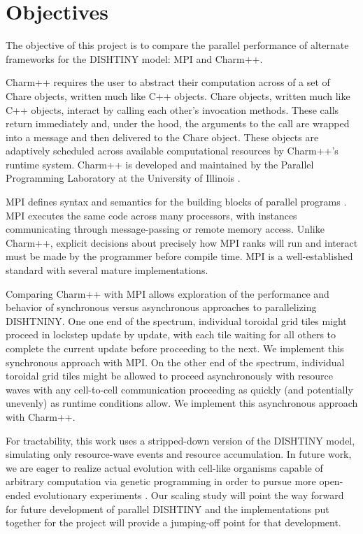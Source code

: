 \section{Objectives}

The objective of this project is to compare the parallel performance of alternate frameworks for the DISHTINY model: MPI and Charm++.

Charm++ requires the user to abstract their computation across of a set of Chare objects, written much like C++ objects.
Chare objects, written much like C++ objects, interact by calling each other's invocation methods.
These calls return immediately and, under the hood, the arguments to the call are wrapped into a message and then delivered to the Chare object.
These objects are adaptively scheduled across available computational resources by Charm++'s runtime system.
Charm++ is developed and maintained by the Parallel Programming Laboratory at the University of Illinois \cite{kale1993charm++}.

MPI defines syntax and semantics for the building blocks of parallel programs \cite{Forum:1994:MMI:898758}.
MPI executes the same code across many processors, with instances communicating through message-passing or remote memory access.
Unlike Charm++, explicit decisions about precisely how MPI ranks will run and interact must be made by the programmer before compile time.
MPI is a well-established standard with several mature implementations.

Comparing Charm++ with MPI allows exploration of the performance and behavior of synchronous versus asynchronous approaches to parallelizing DISHTNINY.
One one end of the spectrum, individual toroidal grid tiles might proceed in lockstep update by update, with each tile waiting for all others to complete the current update before proceeding to the next.
We implement this synchronous approach with MPI.
On the other end of the spectrum, individual toroidal grid tiles might be allowed to proceed asynchronously with resource waves with any cell-to-cell communication proceeding as quickly (and potentially unevenly) as runtime conditions allow.
We implement this asynchronous approach with Charm++.

For tractability, this work uses a stripped-down version of the DISHTINY model, simulating only resource-wave events and resource accumulation.
In future work, we are eager to realize actual evolution with cell-like organisms capable of arbitrary computation via genetic programming in order to pursue more open-ended evolutionary experiments \cite{lalejini2018evolving}.
Our scaling study will point the way forward for future development of parallel DISHTINY and the implementations put together for the project will provide a jumping-off point for that development.
